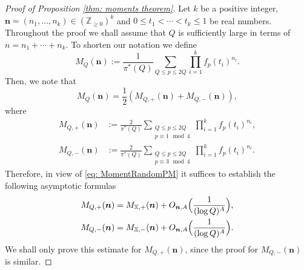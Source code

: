 \documentclass[JEP,XML,SOM,Unicode,NoFloatCountersInSection,published]{cedram}
\theoremstyle{plain}
\theoremstyle{definition}
\newcommand{\X}{\mathbb{X}}
\newcommand{\un}{\boldsymbol{n}}
\begin{document}
\begin{proof}[Proof of Proposition \ref{thm: moments theorem}]
Let $k$ be a positive integer, $\boldsymbol{n} = (n_1, \dots, n_k)\in (\mathbb{Z}_{\geq 0})^k$ and $0 \leq t_1 < \cdots < t_k \leq 1$ be real numbers.
Throughout the proof we shall assume that $Q$ is sufficiently large in terms of $n=n_1+\cdots+n_k$. To shorten our notation we define
\[
M_{Q}(\boldsymbol{n}):= \frac{1}{\pi^*(Q)} \sum_{Q\leq p \leq 2Q} \prod_{i =1}^k f_{p}(t_i)^{n_i}.
\]
Then, we note that
\[M_{Q}(\boldsymbol{n})= \frac{1}{2}\left(M_{Q,+}(\boldsymbol{n})+ M_{Q,-}(\boldsymbol{n})\right),\]
where
\begin{equation}\label{eq: moment sequence}
\begin{aligned}
M_{Q,+}(\boldsymbol{n})&:= \frac{2}{\pi^*(Q)} \sum_{\substack{Q\leq p \leq 2Q\\ p \equiv 1 \, \bmod 4}} \prod_{i =1}^k f_{p}(t_i)^{n_i},\\
M_{Q,-}(\boldsymbol{n})&:= \frac{2}{\pi^*(Q)} \sum_{\substack{Q\leq p \leq 2Q\\ p \equiv 3 \, \bmod 4}} \prod_{i =1}^k f_{p}(t_i)^{n_i}.
\end{aligned}
\end{equation}
Therefore, in view of \eqref{eq: MomentRandomPM} it suffices to establish the following asymptotic formulas
\begin{equation}\label{eq: AsymptoticPlusMinus}
\begin{aligned}
M_{Q, +}(\boldsymbol{n}) &= M_{\X, +}(\boldsymbol{n}) + O_{\boldsymbol{n},A}\Bigl(\frac{1}{(\log Q)^{A}}\Bigr),\\
M_{Q, -}(\boldsymbol{n}) &= M_{\X, -}(\boldsymbol{n}) + O_{\boldsymbol{n},A}\Bigl(\frac{1}{(\log Q)^{A}}\Bigr).
\end{aligned}
\end{equation}
We shall only prove this estimate for $M_{Q, +}(\boldsymbol{n})$, since the proof for $M_{Q, -}(\un)$ is similar.


\end{proof}
\end{document}
